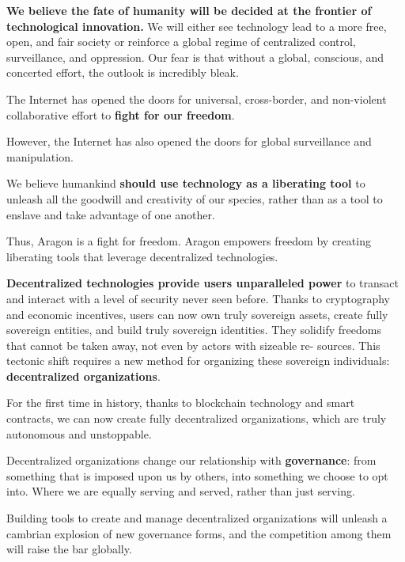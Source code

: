 
\label{chap:AragonManifesto}

\textbf{We believe the fate of humanity will be decided at the frontier of technological innovation.} 
We will either see technology lead to a more free, open, and fair society or reinforce a global regime of centralized control, surveillance, and oppression. Our fear is that without a global, conscious, and concerted effort, the outlook is incredibly bleak.

The Internet has opened the doors for universal, cross-border, and non-violent collaborative effort to \textbf{fight for our freedom}.

However, the Internet has also opened the doors for global surveillance and manipulation.

We believe humankind \textbf{should use technology as a liberating tool} to unleash all the goodwill and creativity of our species, rather than as a tool to enslave and take advantage of one another.

Thus, Aragon is a fight for freedom. Aragon empowers freedom by creating liberating tools that leverage decentralized technologies.

\textbf{Decentralized technologies provide users unparalleled power} to transact and interact with a level of security never seen before. Thanks to cryptography and economic incentives, users can now own truly sovereign assets, create fully sovereign entities, and build truly sovereign identities. They solidify freedoms that cannot be taken away, not even by actors with sizeable re- sources. This tectonic shift requires a new method for organizing these sovereign individuals: \textbf{decentralized organizations}.

For the first time in history, thanks to blockchain technology and smart contracts, we can now create fully decentralized organizations, which are truly autonomous and unstoppable.

Decentralized organizations change our relationship with \textbf{governance}: from something that is imposed upon us by others, into something we choose to opt into. 
Where we are equally serving and served, rather than just serving.

Building tools to create and manage decentralized organizations will unleash a cambrian explosion of new governance forms, and the competition among them will raise the bar globally.

